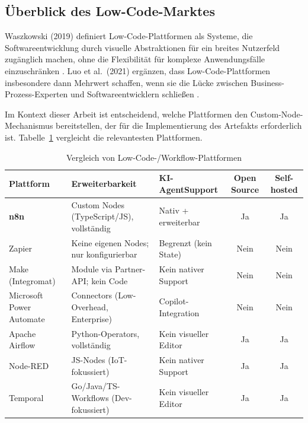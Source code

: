 \documentclass[12pt,a4paper,oneside]{report}
\begin{document}
\subsection{Überblick des Low-Code-Marktes}

Waszkowski (2019) definiert Low-Code-Plattformen als Systeme, die
Software\-entwicklung durch visuelle Abstraktionen für ein breites Nutzerfeld
zugänglich machen, ohne die Flexibilität für komplexe Anwendungsfälle einzuschränken
\cite{waszkowski2019lowcode}. Luo et al.\ (2021) ergänzen, dass Low-Code-Plattformen
insbesondere dann Mehrwert schaffen, wenn sie die Lücke zwischen
Business-Prozess-Experten und Softwareentwicklern schließen
\cite{luo2021characteristics}.

Im Kontext dieser Arbeit ist entscheidend, welche Plattformen den Custom-Node-Mechanismus
bereitstellen, der für die Implementierung des Artefakts erforderlich ist.
Tabelle~\ref{tab:lowcode-vergleich} vergleicht die relevantesten Plattformen.

\begin{table}[H]
  \centering
  \caption{Vergleich von Low-Code-/Workflow-Plattformen}
  \label{tab:lowcode-vergleich}
  \begin{tabularx}{\textwidth}{lXXcc}
    \toprule
    \textbf{Plattform} & \textbf{Erweiter\-barkeit} & \textbf{KI-Agent\-Support} &
    \textbf{Open Source} & \textbf{Self-hosted} \\
    \midrule
    \textbf{n8n}              & Custom Nodes (TypeScript/JS), vollständig & Nativ + erweiterbar & Ja & Ja \\
    Zapier                    & Keine eigenen Nodes; nur konfigurierbar   & Begrenzt (kein State) & Nein & Nein \\
    Make (Integromat)         & Module via Partner-\ac{API}; kein Code    & Kein nativer Support  & Nein & Nein \\
    Microsoft Power Automate  & Connectors (Low-Overhead, Enterprise)     & Copilot-Integration   & Nein & Nein \\
    Apache Airflow            & Python-Operators, vollständig             & Kein visueller Editor & Ja & Ja \\
    Node-RED                  & JS-Nodes (IoT-fokussiert)                 & Kein nativer Support  & Ja & Ja \\
    Temporal                  & Go/Java/TS-Workflows (Dev-fokussiert)     & Kein visueller Editor & Ja & Ja \\
    \bottomrule
  \end{tabularx}
\end{table}
\end{document}
